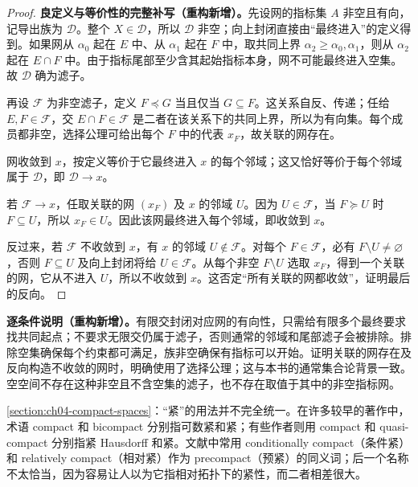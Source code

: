 \documentclass[../../main.tex]{subfiles}
\begin{document}
\begin{proof}
\textbf{良定义与等价性的完整补写（重构新增）。}先设网的指标集 $A$ 非空且有向，记导出族为 $\mathcal D$。整个 $X\in\mathcal D$，所以 $\mathcal D$ 非空；向上封闭直接由“最终进入”的定义得到。如果网从 $\alpha_0$ 起在 $E$ 中、从 $\alpha_1$ 起在 $F$ 中，取共同上界 $\alpha_2\ge\alpha_0,\alpha_1$，则从 $\alpha_2$ 起在 $E\cap F$ 中。由于指标尾部至少含其起始指标本身，网不可能最终进入空集。故 $\mathcal D$ 确为滤子。

再设 $\mathcal F$ 为非空滤子，定义 $F\preceq G$ 当且仅当 $G\subseteq F$。这关系自反、传递；任给 $E,F\in\mathcal F$，交 $E\cap F\in\mathcal F$ 是二者在该关系下的共同上界，所以为有向集。每个成员都非空，选择公理可给出每个 $F$ 中的代表 $x_F$，故关联的网存在。

网收敛到 $x$，按定义等价于它最终进入 $x$ 的每个邻域；这又恰好等价于每个邻域属于 $\mathcal D$，即 $\mathcal D\to x$。

若 $\mathcal F\to x$，任取关联的网 $(x_F)$ 及 $x$ 的邻域 $U$。因为 $U\in\mathcal F$，当 $F\succeq U$ 时 $F\subseteq U$，所以 $x_F\in U$。因此该网最终进入每个邻域，即收敛到 $x$。

反过来，若 $\mathcal F$ 不收敛到 $x$，有 $x$ 的邻域 $U\notin\mathcal F$。对每个 $F\in\mathcal F$，必有 $F\setminus U\ne\varnothing$，否则 $F\subseteq U$ 及向上封闭将给 $U\in\mathcal F$。从每个非空 $F\setminus U$ 选取 $x_F$，得到一个关联的网，它从不进入 $U$，所以不收敛到 $x$。这否定“所有关联的网都收敛”，证明最后的反向。
\end{proof}
\begin{remark}
\textbf{逐条件说明（重构新增）。}有限交封闭对应网的有向性，只需给有限多个最终要求找共同起点；不要求无限交仍属于滤子，否则通常的邻域和尾部滤子会被排除。排除空集确保每个约束都可满足，族非空确保有指标可以开始。证明关联的网存在及反向构造不收敛的网时，明确使用了选择公理；这与本书的通常集合论背景一致。空空间不存在这种非空且不含空集的滤子，也不存在取值于其中的非空指标网。
\end{remark}
\cref{section:ch04-compact-spaces}：“紧”的用法并不完全统一。在许多较早的著作中，术语 compact 和 bicompact 分别指可数紧和紧；有些作者则用 compact 和 quasi-compact 分别指紧 Hausdorff 和紧。文献中常用 conditionally compact（条件紧）和 relatively compact（相对紧）作为 precompact（预紧）的同义词；后一个名称不太恰当，因为容易让人以为它指相对拓扑下的紧性，而二者相差很大。
\end{document}
